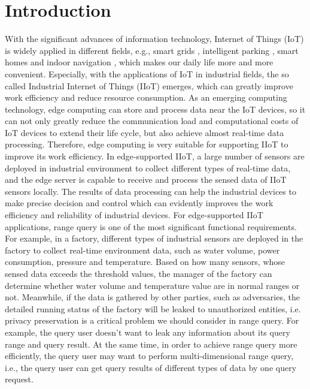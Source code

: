 \documentclass[IEEE JOURNAL OF BIOMEDICAL AND HEALTH INFORMATICS]{IEEEtran}
\begin{document}
\section{Introduction}
With the significant advances of information technology, Internet of Things (IoT) is widely applied in different fields, e.g., smart grids \cite{2020Smart}, intelligent parking \cite{8994072}, smart homes \cite{javed65automated} and indoor navigation \cite{8416714}, which makes our daily life more and more convenient. Especially, with the applications of IoT in industrial fields, the so called Industrial Internet of Things (IIoT) \cite{8843900} emerges, which can greatly improve work efficiency and reduce resource consumption. As an emerging computing technology, edge computing \cite{8016573} can store and process data near the IoT devices, so it can not only greatly reduce the communication load and computational costs of IoT devices to extend their life cycle, but also achieve almost real-time data processing. Therefore, edge computing is very suitable for supporting IIoT to improve its work efficiency. In edge-supported IIoT, a large number of sensors are deployed in industrial environment to collect different types of real-time data, and the edge server is capable to receive and process the sensed data of IIoT sensors locally. The results of data processing can help the industrial devices to make precise decision and control which can evidently improves the work efficiency and reliability of industrial devices. For edge-supported IIoT applications, range query is one of the most significant functional requirements. For example, in a factory, different types of industrial sensors are deployed in the factory to collect real-time environment data, such as water volume, power consumption, pressure and temperature. Based on how many sensors, whose sensed data exceeds the threshold values, the manager of the factory can determine whether water volume and temperature value are in normal ranges or not. Meanwhile, if the data is gathered by other parties, such as adversaries, the detailed running status of the factory will be leaked to unauthorized entities, i.e. privacy preservation \cite{8600750} is a critical problem we should consider in range query. For example, the query user doesn't want to leak any information about its query range and query result. At the same time, in order to achieve range query more efficiently, the query user may want to perform multi-dimensional range query, i.e., the query user can get query results of different types of data by one query request.
\end{document}

